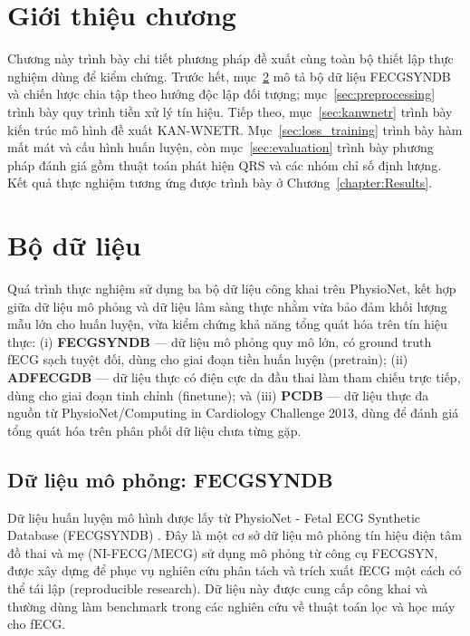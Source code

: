 \documentclass[../DoAn.tex]{subfiles}
\begin{document}

\section{Giới thiệu chương}

Chương này trình bày chi tiết phương pháp đề xuất cùng toàn bộ thiết lập thực nghiệm dùng để kiểm chứng. Trước hết, mục~\ref{sec:dataset} mô tả bộ dữ liệu FECGSYNDB và chiến lược chia tập theo hướng độc lập đối tượng; mục~\ref{sec:preprocessing} trình bày quy trình tiền xử lý tín hiệu. Tiếp theo, mục~\ref{sec:kanwnetr} trình bày kiến trúc mô hình đề xuất KAN-WNETR. Mục~\ref{sec:loss_training} trình bày hàm mất mát và cấu hình huấn luyện, còn mục~\ref{sec:evaluation} trình bày phương pháp đánh giá gồm thuật toán phát hiện QRS và các nhóm chỉ số định lượng. Kết quả thực nghiệm tương ứng được trình bày ở Chương~\ref{chapter:Results}.

\section{Bộ dữ liệu}
\label{sec:dataset}
Quá trình thực nghiệm sử dụng ba bộ dữ liệu công khai trên PhysioNet, kết hợp giữa dữ liệu mô phỏng và dữ liệu lâm sàng thực nhằm vừa bảo đảm khối lượng mẫu lớn cho huấn luyện, vừa kiểm chứng khả năng tổng quát hóa trên tín hiệu thực: (i) \textbf{FECGSYNDB} --- dữ liệu mô phỏng quy mô lớn, có ground truth fECG sạch tuyệt đối, dùng cho giai đoạn tiền huấn luyện (pretrain); (ii) \textbf{ADFECGDB} --- dữ liệu thực có điện cực da đầu thai làm tham chiếu trực tiếp, dùng cho giai đoạn tinh chỉnh (finetune); và (iii) \textbf{PCDB} --- dữ liệu thực đa nguồn từ PhysioNet/Computing in Cardiology Challenge 2013, dùng để đánh giá tổng quát hóa trên phân phối dữ liệu chưa từng gặp.

\subsection{Dữ liệu mô phỏng: FECGSYNDB}
Dữ liệu huấn luyện mô hình được lấy từ PhysioNet - Fetal ECG Synthetic Database (FECGSYNDB) \cite{andreottiOpensourceFrameworkStresstesting2016}. Đây là một cơ sở dữ liệu mô phỏng tín hiệu điện tâm đồ thai và mẹ (NI-FECG/MECG) sử dụng mô phỏng từ công cụ FECGSYN, được xây dựng để phục vụ nghiên cứu phân tách và trích xuất fECG một cách có thể tái lập (reproducible research). Dữ liệu này được cung cấp công khai và thường dùng làm benchmark trong các nghiên cứu về thuật toán lọc và học máy cho fECG.
\end{document}
